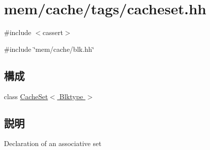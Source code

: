 \hypertarget{cacheset_8hh}{
\section{mem/cache/tags/cacheset.hh}
\label{cacheset_8hh}
}
{\ttfamily \#include $<$cassert$>$}\par
{\ttfamily \#include \char`\"{}mem/cache/blk.hh\char`\"{}}\par
\subsection*{構成}
\begin{DoxyCompactItemize}
\item 
class \hyperlink{classCacheSet}{CacheSet$<$ Blktype $>$}
\end{DoxyCompactItemize}


\subsection{説明}
Declaration of an associative set 